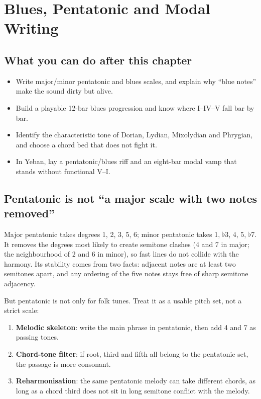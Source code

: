 \clearpage
\chapter{Blues, Pentatonic and Modal Writing}
\label{chap:blues-pentatonic-modal}


\section*{What you can do after this chapter}
\begin{itemize}
  \item Write major/minor pentatonic and blues scales, and explain why ``blue notes'' make the sound dirty but alive.
  \item Build a playable 12-bar blues progression and know where I--IV--V fall bar by bar.
  \item Identify the characteristic tone of Dorian, Lydian, Mixolydian and Phrygian, and choose a chord bed that does not fight it.
  \item In Yeban, lay a pentatonic/blues riff and an eight-bar modal vamp that stands without functional V--I.
\end{itemize}

\section{Pentatonic is not ``a major scale with two notes removed''}

Major pentatonic takes degrees 1, 2, 3, 5, 6; minor pentatonic takes 1, \(\flat\)3, 4, 5, \(\flat\)7. It removes the degrees most likely to create semitone clashes (4 and 7 in major; the neighbourhood of 2 and 6 in minor), so fast lines do not collide with the harmony. Its stability comes from two facts: adjacent notes are at least two semitones apart, and any ordering of the five notes stays free of sharp semitone adjacency.

But pentatonic is not only for folk tunes. Treat it as a usable pitch set, not a strict scale:

\begin{enumerate}
  \item \textbf{Melodic skeleton}: write the main phrase in pentatonic, then add 4 and 7 as passing tones.
  \item \textbf{Chord-tone filter}: if root, third and fifth all belong to the pentatonic set, the passage is more consonant.
  \item \textbf{Reharmonisation}: the same pentatonic melody can take different chords, as long as a chord third does not sit in long semitone conflict with the melody.
\end{enumerate}

